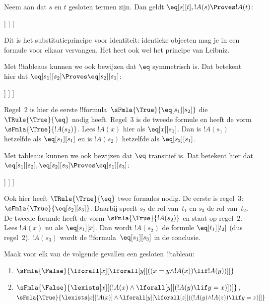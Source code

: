 \documentclass[openany]{memoir}
\begin{document}
\begin{ex}
Neem aan dat $s$ en $t$ gesloten termen zijn. Dan geldt
$\eq[s][t], !A(s) \Proves !A(t)$:
\begin{oltableau}
  [\sFmla{\False}{\formula{A}(t)}, just = \TAss
    [\sFmla{\True}{\eq[s][t]}, just = \TAss
      [\sFmla{\True}{\formula{A}(s)}, just = \TAss
        [\sFmla{\True}{\formula{A}(t)}, just={\TRule{\True}{\eq}[2, 3]}, close]
      ]
    ]
  ]
\end{oltableau}
Dit is het substitutieprincipe voor identiteit: identieke objecten mag
je in een formule voor elkaar vervangen. Het heet ook wel het principe
van Leibniz.

Met !!{tableau}s kunnen we ook bewijzen dat $\eq$ symmetrisch is. Dat
betekent hier dat $\eq[s_1][s_2] \Proves \eq[s_2][s_1]$:
\begin{oltableau}
  [\sFmla{\False}{\eq[s_2][s_1]}, just = \TAss
    [\sFmla{\True}{\eq[s_1][s_2]}, just = \TAss
      [\sFmla{\True}{\eq[s_1][s_1]}, just = {$\eq$}
        [\sFmla{\True}{\eq[s_2][s_1]}, just = {\TRule{\True}{\eq}[2, 3]}, close]
      ]
    ]
  ]
\end{oltableau}
Regel~$2$ is hier de eerste
!!{formula}~$\sFmla{\True}{\eq[s_1][s_2]}$ die
$\TRule{\True}{\eq}$ nodig heeft. Regel~$3$ is de tweede formule en
heeft de vorm $\sFmla{\True}{!A(s_2)}$. Lees
$!A(x)$ hier als $\eq[x][s_1]$. Dan is $!A(s_1)$ hetzelfde als
$\eq[s_1][s_1]$ en is $!A(s_2)$ hetzelfde als $\eq[s_2][s_1]$.

Met tableaus kunnen we ook bewijzen dat $\eq$ transitief is. Dat
betekent hier dat
$\eq[s_1][s_2], \eq[s_2][s_3] \Proves \eq[s_1][s_3]$:
\begin{oltableau}
  [\sFmla{\False}{\eq[s_1][s_3]}, just = \TAss
    [\sFmla{\True}{\eq[s_1][s_2]}, just = \TAss
      [\sFmla{\True}{\eq[s_2][s_3]}, just = \TAss
        [\sFmla{\True}{\eq[s_1][s_3]}, just = {\TRule{\True}{\eq}[3, 2]}, close]
      ]
    ]
  ]
\end{oltableau}
Ook hier heeft $\TRule{\True}{\eq}$ twee formules nodig. De eerste is
regel~$3$: $\sFmla{\True}{\eq[s_2][s_3]}$. Daarbij speelt $s_2$ de rol
van~$t_1$ en $s_3$ de rol van~$t_2$. De tweede formule heeft de vorm
$\sFmla{\True}{!A(s_2)}$ en staat op regel~$2$. Lees $!A(x)$ nu als
$\eq[s_1][x]$. Dan wordt $!A(s_2)$ de formule
$\eq[t_1][t_2]$ (dus regel~$2$). $!A(s_3)$ wordt de
!!{formula}~$\eq[s_1][s_3]$ in de conclusie.
\end{ex}

\begin{prob}
Maak voor elk van de volgende gevallen een gesloten !!{tableau}:
\begin{enumerate}
\item $\sFmla{\False}{\lforall[x][\lforall[y][((x = y \land !A(x))
      \lif !A(y))]]}$
\item $\sFmla{\False}{\lexists[x][(!A(x) \land
    \lforall[y][(!A(y) \lif y = x)])]}$,\\
  $\sFmla{\True}{\lexists[x][!A(x)] \land
    \lforall[y][\lforall[z][((!A(y) \land !A(z)) \lif y = z)]]}$
\end{enumerate}
\end{prob}
\endgroup
\end{document}
